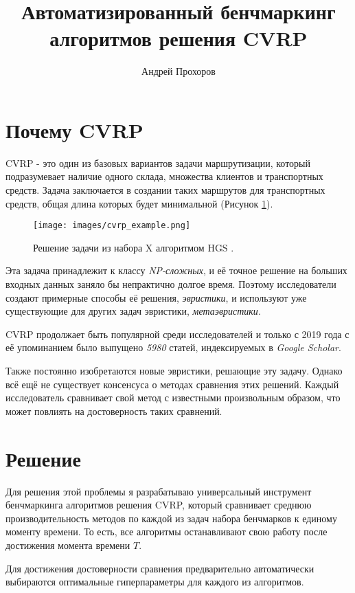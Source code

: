\documentclass[a4paper,12pt]{article}
\title{Автоматизированный бенчмаркинг алгоритмов решения CVRP}
\author{Андрей Прохоров}
\date{\vspace{-5ex}}
\begin{document}
\maketitle

\section*{Почему CVRP}

CVRP - это один из базовых вариантов задачи
маршрутизации, который подразумевает наличие
одного склада, множества клиентов и транспортных
средств. Задача заключается в создании таких
маршрутов для транспортных средств, общая длина
которых будет минимальной (Рисунок \ref{cvrp_example}).

\begin{figure}[h]
    \centering
    \texttt{[image: images/cvrp\_example.png]}
    \caption{
        Решение задачи из
        набора X \autocite{uchoaNewBenchmarkInstances2017}
        алгоритмом HGS \autocite{vidalHybridGeneticSearch2022}.
        \label{cvrp_example} 
    }
\end{figure}

Эта задача принадлежит к классу \emph{NP-сложных}, и
её точное решение на больших входных данных заняло бы 
непрактично долгое время. Поэтому исследователи создают
примерные способы её решения, \emph{эвристики}, и 
используют уже существующие для других задач эвристики, 
\emph{метаэвристики}.

CVRP продолжает быть популярной среди исследователей и
только с 2019 года с её упоминанием было выпущено 
\emph{5980} статей, индексируемых в \emph{Google Scholar}.

Также постоянно изобретаются новые эвристики, решающие
эту задачу. Однако всё ещё не существует
консенсуса о методах сравнения этих решений. Каждый
исследователь сравнивает свой метод с известными
произвольным образом, что может повлиять на достоверность
таких сравнений.

\section*{Решение}
Для решения этой проблемы я разрабатываю универсальный
инструмент бенчмаркинга алгоритмов решения CVRP, который
сравнивает среднюю производительность методов по каждой
из задач набора бенчмарков к единому моменту времени.
То есть, все алгоритмы останавливают свою работу после
достижения момента времени $T$.

Для достижения достоверности сравнения предварительно
автоматически выбираются оптимальные гиперпараметры для
каждого из алгоритмов.
\end{document}
